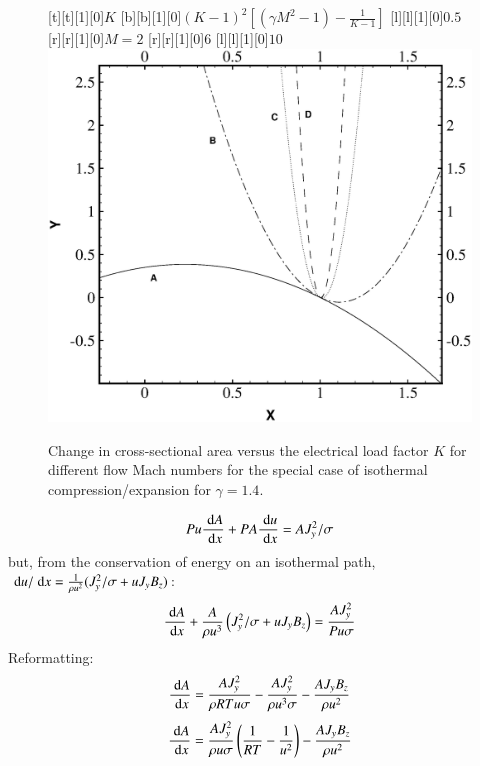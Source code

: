 \documentclass{warpdoc}
\newlength\lengthfigure                  %
\newcommand{\mfd}{\displaystyle}
\newcommand{\ordi}{\; {\rm d}}
\renewcommand{\fontsizefigure}{\footnotesize}
\begin{document}
\begin{figure}
   \fontsizefigure\center
   [t][t][1][0]{$K$}
   [b][b][1][0]{$\mfd (K-1)^2 \left[ (\gamma M^2 -1) - \mfd\frac{1}{K-1} \right]$}
   [l][l][1][0]{$0.5$}
   [r][r][1][0]{$M=2$}
   [r][r][1][0]{$6$}
   [l][l][1][0]{$10$}
   \includegraphics[width=4.36\lengthfigure]{dAdx.eps}
\caption{Change in cross-sectional area versus the electrical load factor $K$
         for different flow Mach numbers for the special case of isothermal compression/expansion
	 for $\gamma=1.4$.}
\label{fig:dAdx}
\end{figure}
%
%
\begin{equation}
P u \frac{\ordi A }{\ordi x}+P A \frac{\ordi u }{\ordi x} = A J_y^2 / \sigma
\end{equation}
%
but, from the conservation of energy on an isothermal path, $\ordi u / \ordi x = \frac{1}{\rho u ^2}(J_y^2/\sigma+u J_y B_z)$:
%
\begin{equation}
\frac{\ordi A }{\ordi x}+ \frac{A}{\rho u^3} \left( J_y^2/\sigma+u J_y B_z \right) = \frac{A J_y^2 }{P u \sigma}
\end{equation}
%
Reformatting:
%
\begin{equation}
\frac{\ordi A }{\ordi x} = \frac{A J_y^2 }{\rho R T u \sigma}
              - \frac{A J_y^2}{\rho u^3\sigma}
              - \frac{A J_y B_z}{\rho u^2}
\end{equation}
%
%
\begin{equation}
\frac{\ordi A }{\ordi x} =
                \frac{A J^2_y}{\rho u\sigma} \left( \frac{1}{RT}-\frac{1}{u^2}\right)
              - \frac{A J_y B_z}{\rho u^2}
\end{equation}
\end{document}

